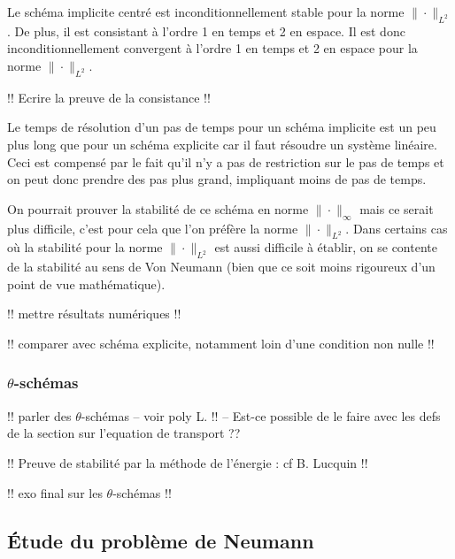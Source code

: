 \documentclass[12pt,a4paper,twoside]{article}
\begin{document}
\begin{proposition}[Convergence]
  Le sch\'ema implicite centr\'e est inconditionnellement stable pour la norme $\| \cdot \|_{L^2}$.
  De plus, il est consistant \`a l'ordre 1 en temps et 2 en espace.
  Il est donc inconditionnellement convergent \`a l'ordre 1 en temps et 2 en espace
  pour la norme $\| \cdot \|_{L^2}$.
\end{proposition}


!! Ecrire la preuve de la consistance !!

\begin{remark}
  Le temps de r\'esolution d'un pas de temps pour un sch\'ema implicite est un peu plus long
  que pour un sch\'ema explicite car il faut r\'esoudre un syst\`eme lin\'eaire.
  Ceci est compens\'e par le fait qu'il n'y a pas de restriction sur le pas de temps et on
  peut donc prendre des pas plus grand, impliquant moins de pas de temps.
\end{remark}


\begin{remark}
  On pourrait prouver la stabilit\'e de ce sch\'ema en norme $\| \cdot \|_{\infty}$
  mais ce serait plus difficile, c'est pour cela que l'on pr\'ef\`ere la norme
  $\| \cdot \|_{L^2}$. Dans certains cas o\`u la stabilit\'e pour la norme $\| \cdot \|_{L^2}$
  est aussi difficile \`a \'etablir, on se contente de la stabilit\'e au sens de Von Neumann
  (bien que ce soit moins rigoureux d'un point de vue math\'ematique).
\end{remark}

!! mettre r\'esultats num\'eriques !!

!! comparer avec sch\'ema explicite, notamment loin d'une condition non nulle !!

\subsubsection{$\theta$-sch\'emas}

!! parler des $\theta$-sch\'emas -- voir poly L. !! 
-- Est-ce possible de le faire avec les defs de la section sur l'equation de transport ??

!! Preuve de stabilit\'e par la m\'ethode de l'\'energie : cf B. Lucquin !!


!! exo final sur les $\theta$-sch\'emas !!


\subsection{\'Etude du probl\`eme de Neumann}
\end{document}
